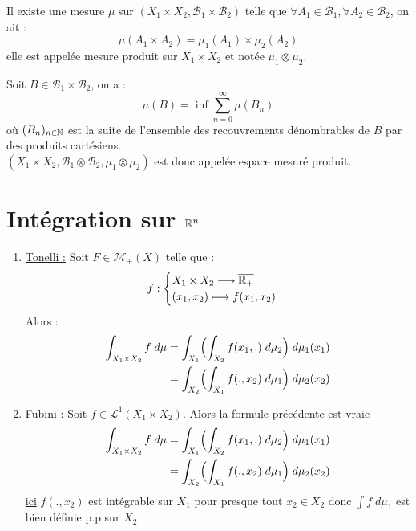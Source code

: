 \begin{definition}
    Il existe une mesure $\mu$ sur $(X_1 \times X_2, \mathcal{B}_1 \times \mathcal{B}_2)$ telle que 
    $ \forall A_1 \in \mathcal{B}_1, \forall A_2 \in \mathcal{B}_2$, on ait :
        \[ \mu (A_1 \times A_2) = \mu_1(A_1) \times \mu_2(A_2) \]
    elle est appelée mesure produit sur $X_1 \times X_2$ et notée $\mu_1 \otimes \mu_2$. 
\end{definition}

\newpage 

\begin{definition}
    Soit $ B \in \mathcal{B}_1 \times \mathcal{B}_2$, on a :
        \[ \mu(B) = \inf \sum_{n=0}^{\infty} \mu (B_n) \] 
    où $(B_n)_{n \in \mathbb{N}}$ est la suite de l'ensemble des recouvrements dénombrables de $B$ par des produits cartésiens. \\
    $(X_1 \times X_2,\mathcal{B}_1 \otimes \mathcal{B}_2,\mu_1 \otimes \mu_2)$ est donc appelée espace mesuré produit. 
\end{definition}

\section{Intégration sur $\mathbb{R}^n$}

\begin{theorem}
    \begin{enumerate}
        \item \underline{Tonelli :} Soit $F \in \overline{\mathcal{M}_+}(X)$ telle que :
            \[ f :
                \begin{cases}
                    X_1 \times X_2 \longrightarrow \overline{\mathbb{R}_+} \\ 
                    (x_1,x_2) \longmapsto f(x_1,x_2)
                \end{cases} \] 
            Alors :
                \begin{align*}
                    \int_{X_1 \times X_2} f \; d \mu    &= \int_{X_1} \Bigl( \int_{X_2} f(x_1,.) \; d \mu_2 \Bigr) \; d \mu_1(x_1) \\
                                                        &= \int_{X_2} \Bigl( \int_{X_1} f(.,x_2) \; d \mu_1 \Bigr) \; d \mu_2(x_2)
                \end{align*}
        \item \underline{Fubini :} Soit $f \in \mathcal{L}^1(X_1 \times X_2)$. Alors la formule précédente est vraie 
                \begin{align*}
                    \int_{X_1 \times X_2} f \; d \mu    &= \int_{X_1} \Bigl( \int_{X_2} f(x_1,.) \; d \mu_2 \Bigr) \; d \mu_1(x_1) \\
                                                        &= \int_{X_2} \Bigl( \int_{X_1} f(.,x_2) \; d \mu_1 \Bigr) \; d \mu_2(x_2)
                \end{align*}
                \underline{ici} $f(.,x_2)$ est intégrable sur $X_1$ pour presque tout $x_2 \in X_2$ donc $\int f \; d \mu_1$ est bien définie p.p sur $X_2$
    \end{enumerate}
\end{theorem}

